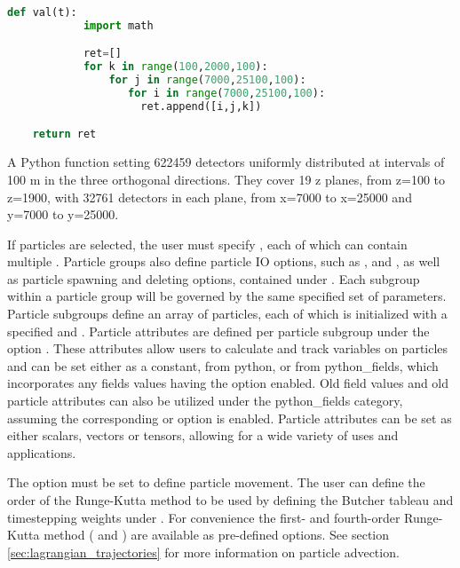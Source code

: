 \begin{example}
  \begin{lstlisting}[language=Python]
def val(t):
            import math

            ret=[]
            for k in range(100,2000,100):
                for j in range(7000,25100,100):
	               for i in range(7000,25100,100):
		             ret.append([i,j,k])

	return ret
  \end{lstlisting}
  \caption{A Python function setting 622459 detectors uniformly distributed
    at intervals of 100 m in the three orthogonal directions. They cover 19 z planes, from z=100 to z=1900, with 32761 detectors in each plane, from
    x=7000 to x=25000 and y=7000 to y=25000.}
  \label{examp:python_function_detectors_1}
\end{example}

If particles are selected, the user must specify , each of which can contain multiple . Particle groups also define particle IO options, such as ,  and , as well as particle spawning and deleting options, contained under . Each subgroup within a particle group will be governed by the same specified set of parameters. Particle subgroups define an array of particles, each of which is initialized with a specified  and . Particle attributes are defined per particle subgroup under the option . These attributes allow users to calculate and track variables on particles and can be set either as a constant, from python, or from python\_fields, which incorporates any fields values having the option  enabled. Old field values and old particle attributes can also be utilized under the python\_fields category, assuming the corresponding  or  option is enabled. Particle attributes can be set as either scalars, vectors or tensors, allowing for a wide variety of uses and applications.

The option  must be set to define particle movement. The user can define the order of the Runge-Kutta method to be used by defining the Butcher tableau and timestepping weights under . For convenience the first- and fourth-order Runge-Kutta method ( and ) are available as pre-defined options. See section \ref{sec:lagrangian_trajectories} for more information on particle advection.

